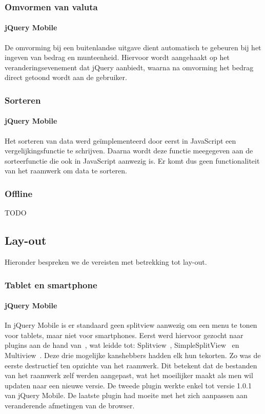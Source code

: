 \subsubsection{Omvormen van valuta}

\paragraph{jQuery Mobile} 
De omvorming bij een buitenlandse uitgave dient automatisch te gebeuren bij het ingeven van bedrag en munteenheid.
Hiervoor wordt aangehaakt op het veranderingsevenement  dat jQuery aanbiedt, waarna na omvorming het bedrag direct getoond wordt aan de gebruiker.

\subsubsection{Sorteren}

\paragraph{jQuery Mobile} 
Het sorteren van data werd geïmplementeerd door eerst in JavaScript een vergelijkingsfunctie te schrijven.
Daarna wordt deze functie meegegeven aan de sorteerfunctie die ook in JavaScript aanwezig is.
Er komt dus geen functionaliteit van het raamwerk om data te sorteren.

\subsubsection{Offline} 
TODO


\subsection{Lay-out}
Hieronder bespreken we de vereisten met betrekking tot lay-out.

\subsubsection{Tablet en smartphone}

\paragraph{jQuery Mobile} 
In jQuery Mobile is er standaard geen splitview aanwezig om een menu te tonen voor tablets, maar niet voor smartphones. 
Eerst werd hiervoor gezocht naar plugins aan de hand van~\cite{Deering2012}, wat leidde tot: Splitview~\cite{Rahman2013}, SimpleSplitView~\cite{Yared2013} en Multiview~\cite{Franck2012}. 
Deze drie mogelijke kanshebbers hadden elk hun tekorten. 
Zo was de eerste destructief ten opzichte van het raamwerk. 
Dit betekent dat de bestanden van het raamwerk zelf werden aangepast, wat het moeilijker maakt als men wil updaten naar een nieuwe versie. 
De tweede plugin werkte enkel tot versie 1.0.1 van jQuery Mobile. 
De laatste plugin had moeite met het zich aanpassen aan veranderende afmetingen van de browser. 

